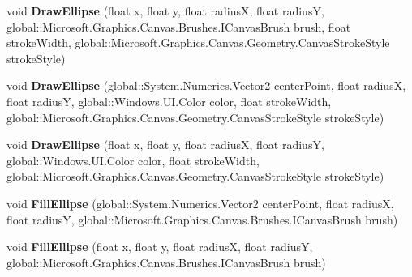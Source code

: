 \begin{DoxyCompactItemize}
\mbox{\label{interface_microsoft_1_1_graphics_1_1_canvas_1_1_i_canvas_drawing_session_aa5fd69dc45450363edef8b82b4c82741}} 
void {\bfseries Draw\+Ellipse} (float x, float y, float radiusX, float radiusY, global\+::\+Microsoft.\+Graphics.\+Canvas.\+Brushes.\+I\+Canvas\+Brush brush, float stroke\+Width, global\+::\+Microsoft.\+Graphics.\+Canvas.\+Geometry.\+Canvas\+Stroke\+Style stroke\+Style)
\item 
\mbox{\label{interface_microsoft_1_1_graphics_1_1_canvas_1_1_i_canvas_drawing_session_aa779cbf1f28162d97b3f19dd267c2a8f}} 
void {\bfseries Draw\+Ellipse} (global\+::\+System.\+Numerics.\+Vector2 center\+Point, float radiusX, float radiusY, global\+::\+Windows.\+U\+I.\+Color color, float stroke\+Width, global\+::\+Microsoft.\+Graphics.\+Canvas.\+Geometry.\+Canvas\+Stroke\+Style stroke\+Style)
\item 
\mbox{\label{interface_microsoft_1_1_graphics_1_1_canvas_1_1_i_canvas_drawing_session_a2e393965452b8dbbd7b71729b4efa2bd}} 
void {\bfseries Draw\+Ellipse} (float x, float y, float radiusX, float radiusY, global\+::\+Windows.\+U\+I.\+Color color, float stroke\+Width, global\+::\+Microsoft.\+Graphics.\+Canvas.\+Geometry.\+Canvas\+Stroke\+Style stroke\+Style)
\item 
\mbox{\label{interface_microsoft_1_1_graphics_1_1_canvas_1_1_i_canvas_drawing_session_a39c562b825f33cb1d1e4908f8ef599f0}} 
void {\bfseries Fill\+Ellipse} (global\+::\+System.\+Numerics.\+Vector2 center\+Point, float radiusX, float radiusY, global\+::\+Microsoft.\+Graphics.\+Canvas.\+Brushes.\+I\+Canvas\+Brush brush)
\item 
\mbox{\label{interface_microsoft_1_1_graphics_1_1_canvas_1_1_i_canvas_drawing_session_aa9ac0d4c464494caf2c2e34570ebd4c8}} 
void {\bfseries Fill\+Ellipse} (float x, float y, float radiusX, float radiusY, global\+::\+Microsoft.\+Graphics.\+Canvas.\+Brushes.\+I\+Canvas\+Brush brush)
\item 
\mbox{\label{interface_microsoft_1_1_graphics_1_1_canvas_1_1_i_canvas_drawing_session_a99d27e62079c68b5810ea610d71051db}} 

\end{DoxyCompactItemize}
